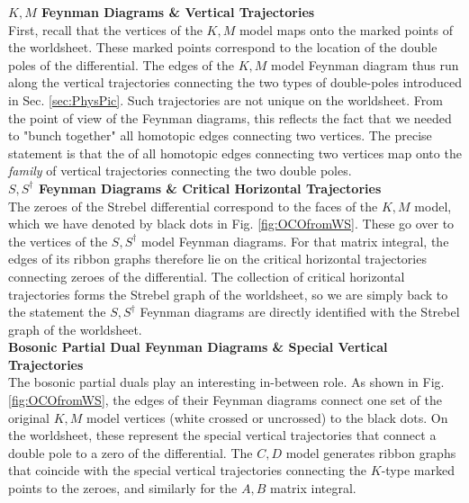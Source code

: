 \documentclass[english]{article}
\renewcommand{\>}{\rangle}
\newcommand{\<}{\langle}
\renewcommand{\(}{\left(}
\renewcommand{\)}{\right)}
\begin{document}
\textbf{$K,M$ Feynman Diagrams \&  Vertical Trajectories}\\
First, recall that the vertices of the $K,M$ model maps onto the marked points of the worldsheet. These marked points correspond to the location of the double poles of the differential. The edges of the $K,M$ model Feynman diagram thus run along the vertical trajectories connecting the two types of double-poles introduced in Sec. \ref{sec:PhysPic}. Such trajectories are not unique on the worldsheet. From the point of view of the Feynman diagrams, this reflects the fact that we needed to "bunch together" all homotopic edges connecting two vertices. The precise statement is that the  of all homotopic edges connecting two vertices map onto the \textit{family} of vertical trajectories connecting the two double poles. \\

\textbf{$S,S^{\dagger}$ Feynman Diagrams \&  Critical Horizontal Trajectories}\\
The zeroes of the Strebel differential correspond to the faces of the $K,M$ model, which we have denoted by black dots in Fig. \ref{fig:OCOfromWS}. These go over to the vertices of the $S,S^{\dagger}$ model Feynman diagrams. For that matrix integral, the edges of its ribbon graphs therefore lie on the critical horizontal trajectories connecting zeroes of the differential. The collection of critical horizontal trajectories forms the Strebel graph of the worldsheet, so we are simply back to the statement the $S,S^{\dagger}$ Feynman diagrams are directly identified with the Strebel graph of the worldsheet. \\

\textbf{Bosonic Partial Dual Feynman Diagrams \&  Special Vertical Trajectories}\\
The bosonic partial duals play an interesting in-between role. As shown in Fig. \ref{fig:OCOfromWS}, the edges of their Feynman diagrams connect one set of the original $K,M$ model vertices (white crossed or uncrossed) to the black dots. On the worldsheet, these represent the special vertical trajectories that connect a double pole to a zero of the differential. The $C,D$ model generates ribbon graphs that coincide with the special vertical trajectories connecting the $K$-type marked points to the zeroes, and similarly for the $A,B$ matrix integral. \\
\end{document}
